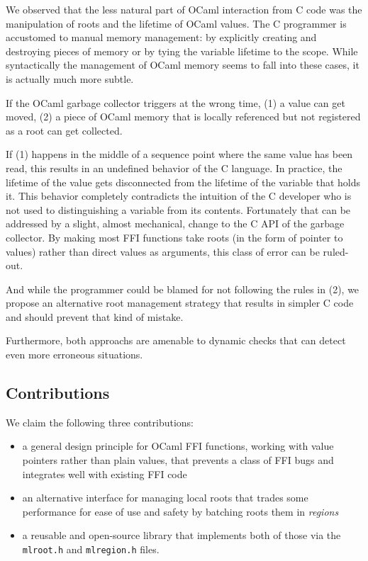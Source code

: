 \documentclass[a4paper]{easychair}
\newcommand{\cpp}[1]{\lstinline[style=C++]{#1}}
\begin{document}
We observed that the less natural part of OCaml interaction from C code
was the manipulation of roots and the lifetime of OCaml values. The C
programmer is accustomed to manual memory management: by explicitly
creating and destroying pieces of memory or by tying the variable
lifetime to the scope. While syntactically the management of OCaml
memory seems to fall into these cases, it is actually much more subtle.

If the OCaml garbage collector triggers at the wrong time, (1) a value
can get moved, (2) a piece of OCaml memory that is locally referenced
but not registered as a root can get collected.

If (1) happens in the middle of a sequence point %
where the same value has been read, this results in an undefined behavior of
the C language. In practice, the lifetime of the value gets disconnected from
the lifetime of the variable that holds it.  This behavior completely
contradicts the intuition of the C developer who is not used to distinguishing
a variable from its contents.  Fortunately that can be addressed by a slight,
almost mechanical, change to the C API of the garbage collector. By making most
FFI functions take roots (in the form of pointer to values) rather than direct
values as arguments, this class of error can be ruled-out.

And while the programmer could be blamed for not following the rules in
(2), we propose an alternative root management strategy that results in simpler
C code and should prevent that kind of mistake.

Furthermore, both approachs are amenable to dynamic checks that can detect even
more erroneous situations.

\subsection{Contributions}

We claim the following three contributions:
%
\begin{itemize}
\item a general design principle for OCaml FFI functions, working with value
      pointers rather than plain values, that prevents a class of FFI bugs and
      integrates well with existing FFI code
\item an alternative interface for managing local roots that trades some
      performance for ease of use and safety by batching roots them in
      {\em regions}
\item a reusable and open-source library that implements both of those via the
      \cpp{mlroot.h} and \cpp{mlregion.h} files.
\end{itemize}
\end{document}
